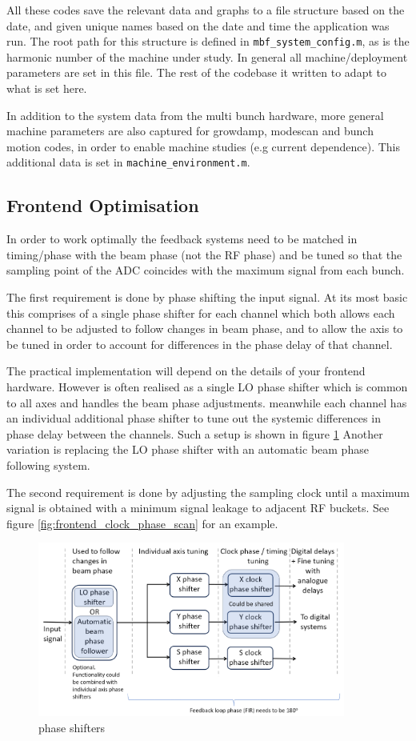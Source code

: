 \documentclass{report}
\begin{document}
All these codes save the relevant data and graphs to a file structure based on the date, and given unique names based on the date and time the application was run. The root path for this structure is defined in \verb|mbf_system_config.m|, as is the harmonic number of the machine under study. In general all machine/deployment parameters are set in this file. The rest of the codebase it written to adapt to what is set here.

In addition to the system data from the multi bunch hardware, more general machine parameters are also captured for growdamp, modescan and bunch motion codes, in order to enable machine studies (e.g current dependence). This additional data is set in \verb|machine_environment.m|.

\subsection{Frontend Optimisation}
In order to work optimally the feedback systems need to be matched in timing/phase with the beam phase (not the RF phase) and be tuned so that the sampling point of the ADC coincides with the maximum signal from each bunch.

The first requirement is done by phase shifting the input signal. At its most basic this comprises of a single phase shifter for each channel which both allows each channel to be adjusted to follow changes in beam phase, and to allow the axis to be  tuned in order to account for differences in the phase delay of that channel.

The practical implementation will depend on the details of your frontend hardware.
However is often realised as a single LO phase shifter which is common to all axes and handles the beam phase adjustments. meanwhile each channel has an individual additional phase shifter to tune out the systemic differences in phase delay between the channels. Such a setup is shown in figure \ref{fig:phase_shifters}
Another variation is replacing the LO phase shifter with an automatic beam phase following system.

The second requirement is done by adjusting the sampling clock until a maximum signal is obtained with a minimum signal leakage to adjacent RF buckets. See figure \ref{fig:frontend_clock_phase_scan} for an example.
\begin{figure}[hbt]
    \centering
        \includegraphics[width=0.9\textwidth]{phase_shifters_overview.png}
        \caption{phase shifters}
        \label{fig:phase_shifters}
\end{figure}
\end{document}
